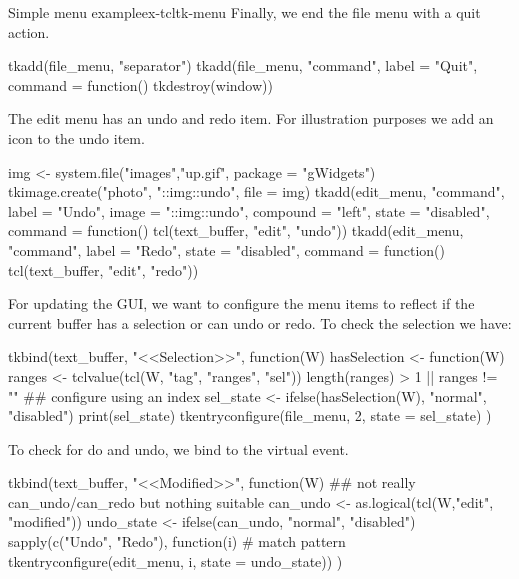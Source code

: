 \begin{example}{Simple menu example}{ex-tcltk-menu}
Finally, we end the file menu with a quit action. 
\begin{Schunk}
\begin{Sinput}
 tkadd(file_menu, "separator")
 tkadd(file_menu, "command", label = "Quit", 
       command = function() tkdestroy(window))
\end{Sinput}
\end{Schunk}

The edit menu has an undo and redo item. For illustration purposes we add an icon to the undo item.
\begin{Schunk}
\begin{Sinput}
 img <- system.file("images","up.gif", package = "gWidgets")
 tkimage.create("photo", "::img::undo", file = img)
 tkadd(edit_menu, "command", label = "Undo",
       image = "::img::undo", compound = "left", 
       state = "disabled",
       command = function() tcl(text_buffer, "edit", "undo"))
 tkadd(edit_menu, "command", label = "Redo", state = "disabled",
       command = function() tcl(text_buffer, "edit", "redo"))
\end{Sinput}
\end{Schunk}

For updating the GUI, we want to configure the menu items to reflect
if the current buffer has a selection or can undo or redo. To check
the selection we have:
\begin{Schunk}
\begin{Sinput}
 tkbind(text_buffer, "<<Selection>>", function(W) {
   hasSelection <- function(W) {
     ranges <- tclvalue(tcl(W, "tag", "ranges", "sel"))
     length(ranges) > 1 || ranges != ""
   }
   ## configure using an index
   sel_state <- ifelse(hasSelection(W), "normal", "disabled")
   print(sel_state)
   tkentryconfigure(file_menu, 2, state = sel_state)
 })
\end{Sinput}
\end{Schunk}
To check for do and undo, we bind to the  virtual event.
\begin{Schunk}
\begin{Sinput}
 tkbind(text_buffer, "<<Modified>>", function(W) {
   ## not really can_undo/can_redo but nothing suitable
   can_undo <- as.logical(tcl(W,"edit", "modified"))
   undo_state <- ifelse(can_undo, "normal", "disabled")
   sapply(c("Undo", "Redo"), function(i)        # match pattern
          tkentryconfigure(edit_menu, i, state = undo_state)) 
 })
\end{Sinput}
\end{Schunk}



\end{example}

